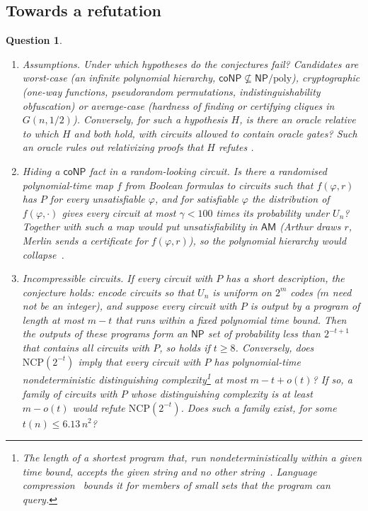 \documentclass[11pt]{article}
\newtheorem{question}{Question}
\theoremstyle{remark}
\newcommand{\NP}{\mathsf{NP}}
\newcommand{\coNP}{\mathsf{coNP}}
\newcommand{\AM}{\mathsf{AM}}
\begin{document}
\subsection*{Towards a refutation}

\begin{question}\label{q:refutation}
\begin{enumerate}
\item \emph{Assumptions.} Under which hypotheses do the conjectures fail? Candidates are worst-case (an infinite polynomial hierarchy, $\coNP \not\subseteq \NP/\mathrm{poly}$), cryptographic (one-way functions, pseudorandom permutations, indistinguishability obfuscation) or average-case (hardness of finding or certifying cliques in $G(n, 1/2)$). Conversely, for such a hypothesis $H$, is there an oracle relative to which $H$ and  both hold, with circuits allowed to contain oracle gates? Such an oracle rules out relativizing proofs that $H$ refutes .
\item \emph{Hiding a $\coNP$ fact in a random-looking circuit.} Is there a randomised polynomial-time map $f$ from Boolean formulas to circuits such that $f(\varphi, r)$ has $P$ for every unsatisfiable $\varphi$, and for satisfiable $\varphi$ the distribution of $f(\varphi, \cdot)$ gives every circuit at most $\gamma < 100$ times its probability under $U_n$? Together with  such a map would put unsatisfiability in $\AM$ (Arthur draws $r$, Merlin sends a certificate for $f(\varphi, r)$), so the polynomial hierarchy would collapse~\cite{bhz1987}.
\item \emph{Incompressible circuits.} If every circuit with $P$ has a short description, the conjecture holds: encode circuits so that $U_n$ is uniform on $2^m$ codes ($m$ need not be an integer), and suppose every circuit with $P$ is output by a program of length at most $m - t$ that runs within a fixed polynomial time bound. Then the outputs of these programs form an $\NP$ set of probability less than $2^{-t+1}$ that contains all circuits with $P$, so  holds if $t \geq 8$. Conversely, does $\mathrm{NCP}(2^{-t})$ imply that every circuit with $P$ has polynomial-time nondeterministic distinguishing complexity\footnote{The length of a shortest program that, run nondeterministically within a given time bound, accepts the given string and no other string~\cite{buhrman-fortnow-laplante}. Language compression~\cite{buhrman-lee-vanmelkebeek} bounds it for members of small sets that the program can query.} at most $m - t + o(t)$? If so, a family of circuits with $P$ whose distinguishing complexity is at least $m - o(t)$ would refute $\mathrm{NCP}(2^{-t})$. Does such a family exist, for some $t(n) \leq 6.13\, n^2$?

\end{enumerate}
\end{question}
\end{document}
